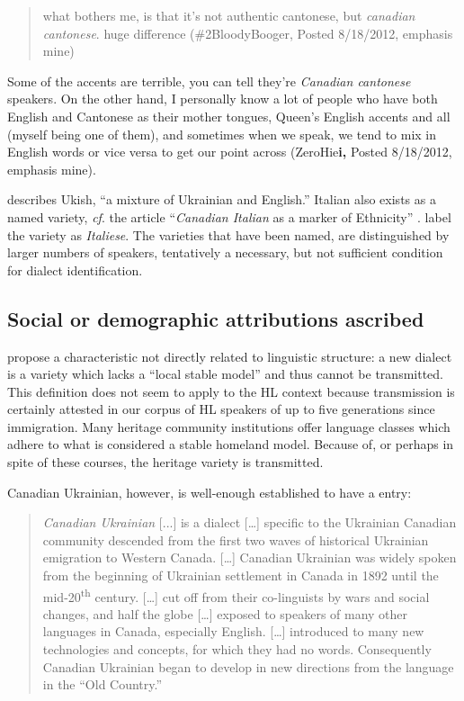 \documentclass[output=paper]{LSP/langsci}
\begin{document}
\begin{quote}
what bothers me, is that it’s not authentic cantonese, but \textit{canadian cantonese}. huge difference (\#2BloodyBooger, Posted 8/18/2012, emphasis mine)
\end{quote}

\begin{styleColorfulGridAccenti}
Some of the accents are terrible, you can tell they’re \textit{Canadian cantonese} speakers. On the other hand, I personally know a lot of people who have both English and Cantonese as their mother tongues, Queen’s English accents and all (myself being one of them), and sometimes when we speak, we tend to mix in English words or vice versa to get our point across (ZeroHie\textbf{i, }Posted 8/18/2012, emphasis mine).
\end{styleColorfulGridAccenti}

\citet[71]{struk_between_2000} describes Ukish, “a mixture of Ukrainian and English.” Italian also exists as a named variety, \textit{cf}. the article “\textit{Canadian Italian} as a marker of Ethnicity” \citep{danesi_canadian_1983,danesi_canadian_1984}. \citet{giovanardi_inglese_2003} label the variety as \textit{Italiese}. The varieties that have been named, are distinguished by larger numbers of speakers, tentatively a necessary, but not sufficient condition for dialect identification.

\subsection{Social or demographic attributions ascribed}

\citet{auer_birth_2004} propose a characteristic not directly related to linguistic structure: a new dialect is a variety which lacks a “local stable model” and thus cannot be transmitted. This definition does not seem to apply to the HL context because transmission is certainly attested in our corpus of HL speakers of up to five generations since immigration. Many heritage community institutions offer language classes which adhere to what is considered a stable homeland model. Because of, or perhaps in spite of these courses, the heritage variety is transmitted. 

Canadian Ukrainian, however, is well-enough established to have a \citet{wikipedia_canadian_2014} entry:

\begin{quote}
\textit{Canadian Ukrainian}\textit{ }[...] is a dialect […] specific to the Ukrainian Canadian community descended from the first two waves of historical Ukrainian emigration to Western Canada. […] Canadian Ukrainian was widely spoken from the beginning of Ukrainian settlement in Canada in 1892 until the mid-20\textsuperscript{th} century. […] cut off from their co-linguists by wars and social changes, and half the globe […] exposed to speakers of many other languages in Canada, especially English. […] introduced to many new technologies and concepts, for which they had no words. Consequently Canadian Ukrainian began to develop in new directions from the language in the “Old Country.”  
\end{quote}
\end{document}
